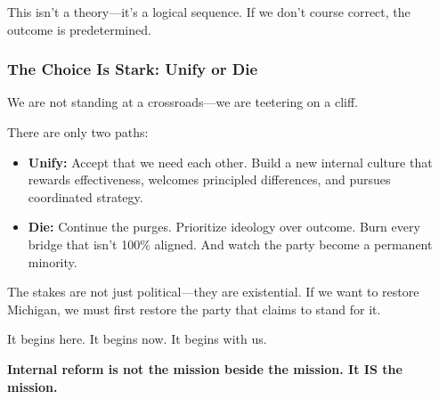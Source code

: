 This isn’t a theory—it’s a logical sequence. If we don’t course correct, the outcome is predetermined.

\subsubsection{The Choice Is Stark: Unify or Die}
We are not standing at a crossroads—we are teetering on a cliff.

There are only two paths:
\begin{itemize}
\item \textbf{Unify:} Accept that we need each other. Build a new internal culture that rewards effectiveness, welcomes principled differences, and pursues coordinated strategy.
\item \textbf{Die:} Continue the purges. Prioritize ideology over outcome. Burn every bridge that isn’t 100\% aligned. And watch the party become a permanent minority.
\end{itemize}

The stakes are not just political—they are existential. If we want to restore Michigan, we must first restore the party that claims to stand for it.

It begins here. It begins now. It begins with us.

\textbf{Internal reform is not the mission beside the mission. It IS the mission.}



